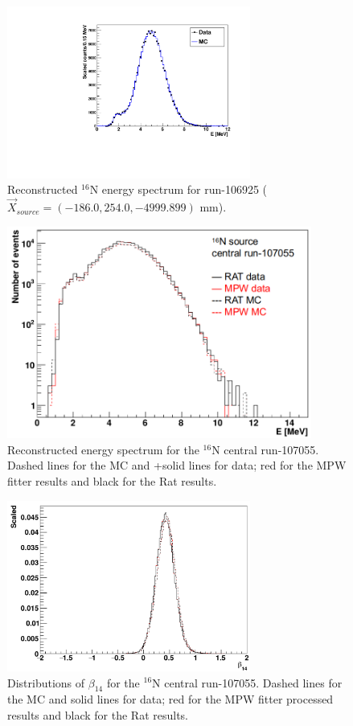 \begin{figure}[htbp]
	\centering
	\includegraphics[width=8cm]{N16energyMPWcompare_106925.pdf}
	\caption{Reconstructed $^{16}$N energy spectrum for run-106925 ($\vec{X}_{source}=(-186.0,254.0,-4999.899)$ mm).}
	\label{N16_106925}
\end{figure}


\begin{figure}[htbp]
	\centering
	\includegraphics[width=10cm]{N16_reconE_107055.png}
	\caption{Reconstructed energy spectrum for the $^{16}$N central run-107055. Dashed lines for the MC and +solid lines for data; red for the MPW fitter results and black for the Rat results.}
	\label{N16energy}
\end{figure}

\begin{figure}[htbp]
	\centering
	\includegraphics[width=8cm]{N16_beta14_107055.png}
	\caption{Distributions of $\beta_{14}$ for the $^{16}$N central run-107055. Dashed lines for the MC and solid lines for data; red for the MPW fitter processed results and black for the Rat results.}
	\label{N16beta14}
\end{figure}


